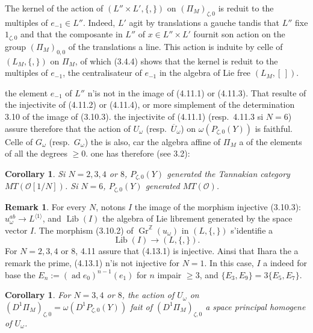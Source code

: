 \documentclass[11pt,a4paper]{article}
\theoremstyle{plain}
\newtheorem{corollary}[theorem]{Corollary}
\theoremstyle{definition}
\newtheorem{remark}[theorem]{Remark}
\DeclareMathOperator{\Lib}{Lib}
\DeclareMathOperator{\ad}{ad}
\newcommand{\Z}{\mathbb{Z}}
\newcommand{\Gr}{\operatorname{Gr}}
\begin{document}
The kernel of the action of $(L'' \times L', \{,\})$ on $(\Pi_M)_{\zeta,0}$ is reduit to the multiples of $e_{-1} \in L''$. Indeed, $L'$ agit by translations a gauche tandis that $L''$ fixe $1_{\zeta,0}$ and that the composante in $L''$ of $x \in L'' \times L'$ fournit son action on the group $(\Pi_M)_{0,0}$ of the translations a line. This action is induite by celle of $(L_M, \{,\})$ on $\Pi_M$, of which (3.4.4) shows that the kernel is reduit to the multiples of $e_{-1}$, the centralisateur of $e_{-1}$ in the algebra of Lie free $(L_M, [\,])$.

the element $e_{-1}$ of $L''$ n'is not in the image of (4.11.1) or (4.11.3). That resulte of the injectivite of (4.11.2) or (4.11.4), or more simplement of the determination 3.10 of the image of (3.10.3). the injectivite of (4.11.1) (resp.~4.11.3 si $N=6$) assure therefore that the action of $U_\omega$ (resp.~$\overline{U}_\omega$) on $\omega(P_{\zeta,0}(Y))$ is faithful. Celle of $G_\omega$ (resp.~$G_\omega$) the is also, car the algebra affine of $\Pi_M$ a of the elements of all the degrees $\geq 0$. one has therefore (see 3.2):

\begin{corollary}\label{cor:4.12}
Si $N=2,3,4$ or $8$, $P_{\zeta,0}(Y)$ generated the Tannakian category $MT(\mathcal{O}[1/N])$. Si $N=6$, $P_{\zeta,0}(Y)$ generated $MT(\mathcal{O})$.
\end{corollary}

\begin{remark}\label{rmk:4.13}
For every $N$, notons $I$ the image of the morphism injective (3.10.3): $u_\omega^{ab} \to L^{\langle 1 \rangle}$, and $\Lib(I)$ the algebra of Lie librement generated by the space vector $I$. The morphism (3.10.2) of $\Gr^\Z(u_\omega)$ in $(L, \{,\})$ s'identifie a
\begin{equation}\label{eq:4.13.1}
\Lib(I) \to (L, \{,\}).
\end{equation}
For $N=2,3,4$ or $8$, 4.11 assure that (4.13.1) is injective. Ainsi that Ihara the a remark the prime, (4.13.1) n'is not injective for $N=1$. In this case, $I$ a indeed for base the $E_n := (\ad e_0)^{n-1}(e_1)$ for $n$ impair $\geq 3$, and $\{E_3, E_9\} = 3\{E_5, E_7\}$.
\end{remark}

\begin{corollary}\label{cor:4.14}
For $N=3,4$ or $8$, the action of $U_\omega$ on $(D^1\Pi_M)_{\zeta,0} = \omega(D^1P_{\zeta,0}(Y))$ fait of $(D^1\Pi_M)_{\zeta,0}$ a space principal homogene of $U_\omega$.
\end{corollary}
\end{document}
